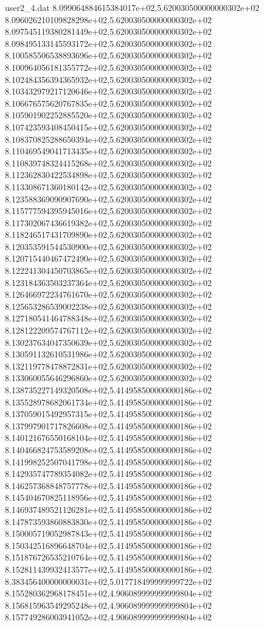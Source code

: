 \begin{filecontents}{user2_4.dat}
8.099064884615384017e+02,5.620030500000000302e+02
8.096026210109828298e+02,5.620030500000000302e+02
8.097545119380281449e+02,5.620030500000000302e+02
8.098495133145593172e+02,5.620030500000000302e+02
8.100585506538893696e+02,5.620030500000000302e+02
8.100964056181355772e+02,5.620030500000000302e+02
8.102484356394365932e+02,5.620030500000000302e+02
8.103432979217120646e+02,5.620030500000000302e+02
8.106676575620767835e+02,5.620030500000000302e+02
8.105901902252885520e+02,5.620030500000000302e+02
8.107423593408450415e+02,5.620030500000000302e+02
8.108370825288650394e+02,5.620030500000000302e+02
8.110469549041713435e+02,5.620030500000000302e+02
8.110839748324415268e+02,5.620030500000000302e+02
8.112362830422534898e+02,5.620030500000000302e+02
8.113308671360180142e+02,5.620030500000000302e+02
8.123588369090907690e+02,5.620030500000000302e+02
8.115777594395945016e+02,5.620030500000000302e+02
8.117302067436619382e+02,5.620030500000000302e+02
8.118246517431709890e+02,5.620030500000000302e+02
8.120353591544530900e+02,5.620030500000000302e+02
8.120715440467472490e+02,5.620030500000000302e+02
8.122241304450703865e+02,5.620030500000000302e+02
8.123184363503237364e+02,5.620030500000000302e+02
8.126466972234761670e+02,5.620030500000000302e+02
8.125653286539002238e+02,5.620030500000000302e+02
8.127180541464788348e+02,5.620030500000000302e+02
8.128122209574767112e+02,5.620030500000000302e+02
8.130237634047350639e+02,5.620030500000000302e+02
8.130591132610531986e+02,5.620030500000000302e+02
8.132119778478872831e+02,5.620030500000000302e+02
8.133060055646296860e+02,5.620030500000000302e+02
8.138735227149320508e+02,5.414958500000000186e+02
8.135528978682061734e+02,5.414958500000000186e+02
8.137059015492957315e+02,5.414958500000000186e+02
8.137997901717826608e+02,5.414958500000000186e+02
8.140121676550168104e+02,5.414958500000000186e+02
8.140466824753589208e+02,5.414958500000000186e+02
8.141998252507041798e+02,5.414958500000000186e+02
8.142935747789354082e+02,5.414958500000000186e+02
8.146257368848757778e+02,5.414958500000000186e+02
8.145404670825118956e+02,5.414958500000000186e+02
8.146937489521126281e+02,5.414958500000000186e+02
8.147873593860883830e+02,5.414958500000000186e+02
8.150005719052987843e+02,5.414958500000000186e+02
8.150342516896648704e+02,5.414958500000000186e+02
8.151876726535210764e+02,5.414958500000000186e+02
8.152811439932413577e+02,5.414958500000000186e+02
8.383456400000000031e+02,5.017718499999999722e+02
8.155280362968178451e+02,4.906089999999999804e+02
8.156815963549295248e+02,4.906089999999999804e+02
8.157749286003941052e+02,4.906089999999999804e+02

\end{filecontents}
